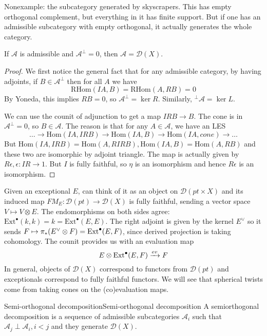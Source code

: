 Nonexample: the subcategory generated by skyscrapers. This has empty orthogonal complement, but everything in it has finite support. But if one has an admissible subcategory with empty orthogonal, it actually generates the whole category.

\begin{proposition}{}{}
    If $\mathcal{A}$ is admissible and $\mathcal{A}^\perp=0$, then $\mathcal{A}=\mathcal{D}(X)$.
\end{proposition}
\begin{proof}[Proof]
    We first notice the general fact that for any admissible category, by having adjoints, if $B\in\mathcal{A}^\perp$ then for all $A$ we have $$\mathrm{RHom}(IA, B)=\mathrm{RHom}(A,RB)=0$$By Yoneda, this implies $RB=0$, so $\mathcal{A}^\perp = \ker R$. Similarly, $^\perp \mathcal{A}=\ker L.$ 
    
    We can use the counit of adjunction to get a map $IRB\xrightarrow{}B$. The cone is in $\mathcal{A}^\perp=0$, so $B\in \mathcal{A}$.  The reason is that for any $A\in \mathcal{A}$, we have an LES $$\dots\xrightarrow{}\mathrm{Hom}(IA, IRB)\xrightarrow{}\mathrm{Hom}(IA, B)\xrightarrow{}\mathrm{Hom}(IA,cone)\xrightarrow{}\dots$$But $\mathrm{Hom}(IA,IRB)=\mathrm{Hom}(A,RIRB), \mathrm{Hom}(IA,B)=\mathrm{Hom}(A,RB)$ and these two are isomorphic by adjoint triangle. The map is actually given by $R\epsilon, \epsilon: IR\xrightarrow{ }1$.  But $I$ is fully faithful, so $\eta$ is an isomorphism and hence $R\epsilon$ is an isomorphism. 
\end{proof}

\begin{remark}{}{}
     Given an exceptional $E$, can think of it as an object on $\mathcal{D}(pt\times X)$ and its induced map $FM_{E}:\mathcal{D}(pt)\xrightarrow{}\mathcal{D}(X)$ is fully faithful, sending a vector space $V\mapsto V\otimes E$. The endomorphisms on both sides agree: $\mathrm{Ext}^\bullet(k,k)=k=\mathrm{Ext}^\bullet(E,E)$. The right adjoint is given by the kernel $E^\lor$ so it sends $F\mapsto \pi_* (E^\lor \otimes F)=\operatorname{Ext}^\bullet(E,F)$, since derived projection is taking cohomology. The counit provides us with an evaluation map $$E\otimes \operatorname{Ext}^\bullet(E,F)\xrightarrow{ev}F$$In general, objects of $\mathcal{D}(X)$ correspond to functors from $\mathcal{D}(pt)$ and exceptionals correspond to fully faithful functors. We will see that spherical twists come from taking cones on the (co)evaluation maps.
\end{remark}


\begin{definition}{Semi-orthogonal decomposition}{Semi-orthogonal decomposition}
    A semiorthogonal decomposition is a sequence of admissible subcategories $\mathcal{A}_{i}$ such that $\mathcal{A}_{j}\perp \mathcal{A}_{i}, i<j$ and they generate $\mathcal{D}(X)$.
\end{definition}


